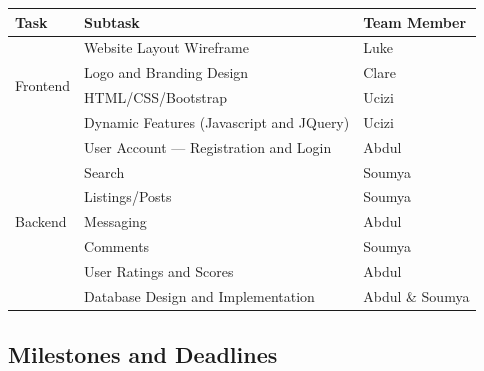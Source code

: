 \documentclass[12pt]{article}
\begin{document}
\begin{table}[ht!]
    \centering
    \begin{tabular}{|l|l|l|}
        \hline
        \textbf{Task}                 & \textbf{Subtask}                         & \textbf{Team Member} \\
        \hline
        \multirow{4}{3.5cm}{Frontend} & Website Layout Wireframe                 & Luke                 \\
        \cline{2-3}
                                      & Logo and Branding Design                 & Clare                \\
        \cline{2-3}
                                      & HTML/CSS/Bootstrap                       & Ucizi                \\
        \cline{2-3}
                                      & Dynamic Features (Javascript and JQuery) & Ucizi                \\
        \hline
        \multirow{7}{3.5cm}{Backend}  & User Account --- Registration and Login  & Abdul                \\
        \cline{2-3}
                                      & Search                                   & Soumya               \\
        \cline{2-3}
                                      & Listings/Posts                           & Soumya               \\
        \cline{2-3}
                                      & Messaging                                & Abdul                \\
        \cline{2-3}
                                      & Comments                                 & Soumya               \\
        \cline{2-3}
                                      & User Ratings and Scores                  & Abdul                \\
        \cline{2-3}
                                      & Database Design and Implementation       & Abdul \& Soumya      \\
        \hline
    \end{tabular}
    \label{tab:tasks}
\end{table}
\pagebreak
\subsection{Milestones and Deadlines}
\end{document}
